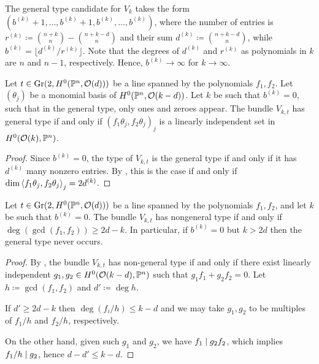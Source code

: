 \begin{remark}
	The general type candidate for $V_k$ takes the form
	$(b^{(k)}+1,\dotsc,b^{(k)}+1,b^{(k)},\dotsc,b^{(k)})$,
	where the number of entries is
	$r^{(k)} \coloneqq \binom{n+k}{n} - \binom{n+k-d}{n}$
	and their sum $d^{(k)} \coloneqq \binom{n+k-d}{n}$, while
	$b^{(k)} = \lfloor d^{(k)}/r^{(k)}\rfloor$.
	Note that the degrees of $d^{(k)}$ and $r^{(k)}$ as polynomials in $k$ are $n$ and $n-1$, respectively. Hence, $b^{(k)} \to \infty$ for $k \to \infty$.
\end{remark}

\begin{corollary} \label{no-more-than-ones}
	Let $t\in \operatorname{Gr}(2,H^0(\mathbb{P}^n, \mathcal{O}(d)))$ be a line spanned by the polynomials $f_1,f_2$. Let $(\theta_j)$ be a monomial basis of $H^0(\mathbb{P}^n, \mathcal{O}(k-d))$. Let $k$ be such that $b^{(k)}=0$, \ie such that in the general type, only ones and zeroes appear. The bundle $V_{k,t}$ has general type if and only if
	$(f_1\theta_j,f_2\theta_j)_j$ is a linearly independent set in $H^0(\mathcal{O}(k), \mathbb{P}^n)$.
\end{corollary}

\begin{proof}
  Since $b^{(k)}=0$, the type of $V_{k,t}$ is the general type if and only if it has $d^{(k)}$ many nonzero entries.
	By , this is the case if and only if $\dim\left\langle f_1 \theta_j, f_2 \theta_j \right\rangle_j = 2 d^{(k)}$.
\end{proof}

\begin{proposition} \label{nongeneral-type-shared-sections}
	Let $t\in \operatorname{Gr}(2,H^0(\mathbb{P}^n, \mathcal{O}(d)))$ be a line spanned by the polynomials $f_1,f_2$, and let $k$ be such that $b^{(k)}=0$. The bundle $V_{k,t}$ has nongeneral type if and only if $\deg(\gcd(f_1,f_2)) \geq 2d-k$. In particular, if $b^{(k)}=0$ but $k>2d$ then the general type never occurs.
\end{proposition}

\begin{proof}
	By , the bundle $V_{k,t}$ has non-general type if and only if there exist linearly independent $g_1,g_2\in H^0(\mathcal{O}(k-d),\mathbb{P}^n)$ such that $g_1f_1+g_2f_2 = 0$. Let $h \coloneqq \gcd(f_1,f_2)$ and $d'\coloneqq \deg h$.

	If $d' \geq 2d-k$ then $\deg (f_i/h) \leq k-d$ and we may take $g_1,g_2$ to be multiples of $f_1/h$ and $f_2/h$, respectively.

	On the other hand, given such $g_1$ and $g_2$, we have $f_1\mid g_2 f_2$, which implies $f_1/h \mid g_2$, hence $d-d'\leq k-d$.
\end{proof}

